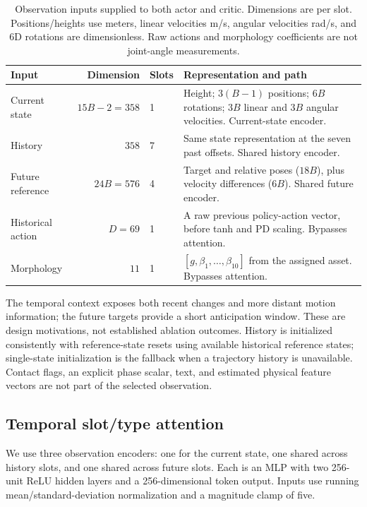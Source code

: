 \documentclass[11pt]{article}
\begin{document}
\begin{table}[t]
\centering
\small
\caption{Observation inputs supplied to both actor and critic. Dimensions are
per slot. Positions/heights use meters, linear velocities m/s, angular
velocities rad/s, and 6D rotations are dimensionless. Raw actions and
morphology coefficients are not joint-angle measurements.}\label{tab:observations}
\begin{tabularx}{\linewidth}{@{}lrlY@{}}
\toprule
Input & Dimension & Slots & Representation and path \\
\midrule
Current state & $15B-2=358$ & 1 &
Height; $3(B-1)$ positions; $6B$ rotations; $3B$ linear and $3B$ angular
velocities. Current-state encoder. \\
History & $358$ & 7 &
Same state representation at the seven past offsets. Shared history encoder. \\
Future reference & $24B=576$ & 4 &
Target and relative poses ($18B$), plus velocity differences ($6B$).
Shared future encoder. \\
Historical action & $D=69$ & 1 &
A raw previous policy-action vector, before tanh and PD scaling.
Bypasses attention. \\
Morphology & $11$ & 1 &
$[g,\beta_1,\ldots,\beta_{10}]$ from the assigned asset.
Bypasses attention. \\
\bottomrule
\end{tabularx}
\end{table}

The temporal context exposes both recent changes and more distant motion
information; the future targets provide a short anticipation window.
These are design motivations, not established ablation outcomes.
History is initialized consistently with reference-state resets using
available historical reference states; single-state initialization is the
fallback when a trajectory history is unavailable.
Contact flags, an explicit phase scalar, text, and estimated physical
feature vectors are not part of the selected observation.

\subsection{Temporal slot/type attention}\label{sec:architecture}

We use three observation encoders: one for the current state, one shared
across history slots, and one shared across future slots. Each is an MLP
with two 256-unit ReLU hidden layers and a 256-dimensional token output.
Inputs use running mean/standard-deviation normalization and a magnitude
clamp of five.
\end{document}
